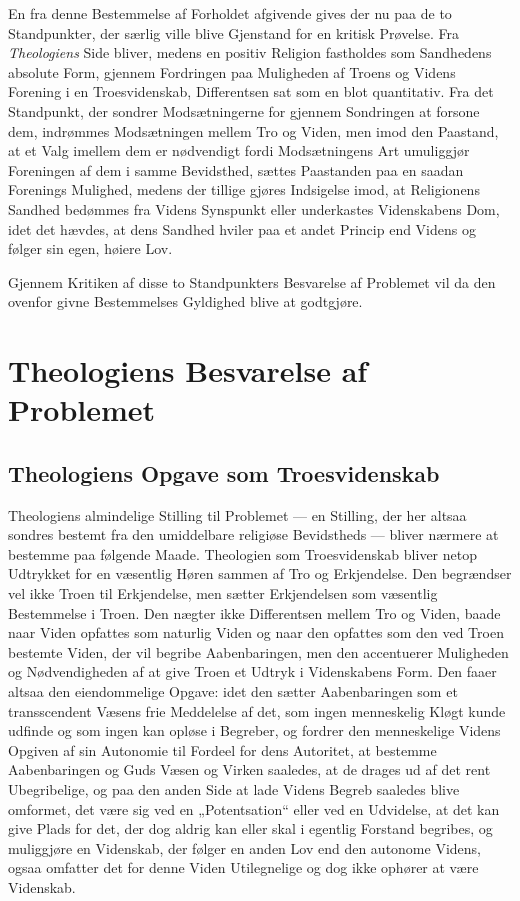 \documentclass[12pt,a4paper]{book}
\newcommand{\opage}[1]{\marginnote{\footnotesize\textit{[#1]}}}
\begin{document}
En fra denne Bestemmelse af Forholdet afgivende gives der nu paa de to
Standpunkter, der særlig ville blive Gjenstand for en kritisk Prøvelse. Fra \emph{Theologiens} Side bliver, medens en positiv Religion fastholdes som Sandhedens
absolute Form, gjennem Fordringen paa Muligheden af Troens og Videns Forening i
en Troesvidenskab, Differentsen sat som en blot quantitativ. Fra det Standpunkt,
der sondrer Modsætningerne for gjennem Sondringen at forsone dem, indrømmes
Modsætningen mellem Tro og Viden, men imod den Paastand, at et Valg imellem dem
er nødvendigt fordi Modsætningens Art umuliggjør Foreningen af dem i samme
Bevidsthed, sættes Paastanden paa en saadan Forenings Mulighed, medens der
tillige gjøres \opage{43}Indsigelse imod, at Religionens Sandhed bedømmes fra Videns
Synspunkt eller underkastes Videnskabens Dom, idet det hævdes, at dens Sandhed
hviler paa et andet Princip end Videns og følger sin egen, høiere Lov.

Gjennem Kritiken af disse to Standpunkters Besvarelse af Problemet vil da den
ovenfor givne Bestemmelses Gyldighed blive at godtgjøre.


\chapter{Theologiens Besvarelse af Problemet}
\label{ch:theologi}

\section{Theologiens Opgave som Troesvidenskab}
\label{sec:troesvidenskab}

Theologiens almindelige Stilling til Problemet --- en Stilling, der her altsaa
sondres bestemt fra den umiddelbare religiøse Bevidstheds --- bliver nærmere at
bestemme paa følgende Maade. Theologien som Troesvidenskab bliver netop Udtrykket
for en væsentlig Høren sammen af Tro og Erkjendelse. Den begrændser vel ikke
Troen til Erkjendelse, men sætter Erkjendelsen som væsentlig Bestemmelse i Troen.
Den nægter ikke Differentsen mellem Tro og Viden, baade naar Viden opfattes som
naturlig Viden og naar den opfattes som den ved Troen bestemte Viden, der vil
begribe Aabenbaringen, men den accentuerer Muligheden og Nødvendigheden af at
give Troen et Udtryk i Videnskabens Form. Den faaer altsaa den eiendommelige
Opgave: idet den sætter Aabenbaringen som et transscendent Væsens frie Meddelelse af det, som ingen menneskelig Kløgt kunde udfinde og som ingen kan opløse i Begreber, og
fordrer den menneskelige Videns Opgiven af sin Autonomie til Fordeel for dens
Autoritet, at bestemme Aabenbaringen og Guds Væsen og Virken saaledes, at de
drages ud af det rent Ubegribelige, og paa den anden Side at lade Videns Begreb
saaledes blive omformet, det være sig ved en „Potentsation“ eller ved en
Udvidelse, at det kan give Plads \opage{44}for det, der dog aldrig kan eller skal i egentlig
Forstand begribes, og muliggjøre en Videnskab, der følger en anden Lov end den
autonome Videns, ogsaa omfatter det for denne Viden Utilegnelige og dog ikke
ophører at være Videnskab.
\end{document}
